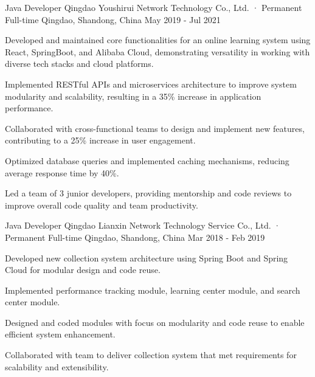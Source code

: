 \begin{cventries}
  \cventry
  {Java Developer} %
  {Qingdao Youshirui Network Technology Co., Ltd. · Permanent Full-time} %
  {Qingdao, Shandong, China} %
  {May 2019 - Jul 2021} %
  {
    \begin{cvitems} %
      \item {Developed and maintained core functionalities for an online learning system using React, SpringBoot, and Alibaba Cloud, demonstrating versatility in working with diverse tech stacks and cloud platforms.}
      \item {Implemented RESTful APIs and microservices architecture to improve system modularity and scalability, resulting in a 35\% increase in application performance.}
      \item {Collaborated with cross-functional teams to design and implement new features, contributing to a 25\% increase in user engagement.}
      \item {Optimized database queries and implemented caching mechanisms, reducing average response time by 40\%.}
      \item {Led a team of 3 junior developers, providing mentorship and code reviews to improve overall code quality and team productivity.}
    \end{cvitems}
  }

  \vspace{5mm}
  \cventry
  {Java Developer} %
  {Qingdao Lianxin Network Technology Service Co., Ltd. · Permanent Full-time} %
  {Qingdao, Shandong, China} %
  {Mar 2018 - Feb 2019} %
  {
    \begin{cvitems} %
      \item {Developed new collection system architecture using Spring Boot and Spring Cloud for modular design and code reuse.}
      \item {Implemented performance tracking module, learning center module, and search center module.}
      \item {Designed and coded modules with focus on modularity and code reuse to enable efficient system enhancement.}
      \item {Collaborated with team to deliver collection system that met requirements for scalability and extensibility.}
    \end{cvitems}
  }


\end{cventries}
